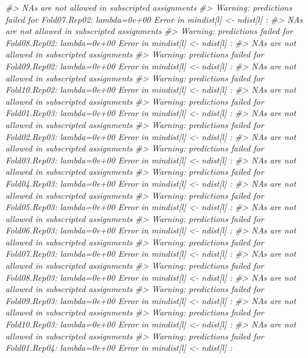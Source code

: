 \documentclass[]{book}
\newenvironment{Shaded}{\begin{snugshade}}{\end{snugshade}}
\newcommand{\CommentTok}[1]{\textcolor[rgb]{0.56,0.35,0.01}{\textit{#1}}}
\begin{document}
\begin{Shaded}
\begin{Highlighting}[]
\CommentTok{#>   NAs are not allowed in subscripted assignments}
\CommentTok{#> Warning: predictions failed for Fold07.Rep02: lambda=0e+00 Error in mindist[l] <- ndist[l] : }
\CommentTok{#>   NAs are not allowed in subscripted assignments}
\CommentTok{#> Warning: predictions failed for Fold08.Rep02: lambda=0e+00 Error in mindist[l] <- ndist[l] : }
\CommentTok{#>   NAs are not allowed in subscripted assignments}
\CommentTok{#> Warning: predictions failed for Fold09.Rep02: lambda=0e+00 Error in mindist[l] <- ndist[l] : }
\CommentTok{#>   NAs are not allowed in subscripted assignments}
\CommentTok{#> Warning: predictions failed for Fold10.Rep02: lambda=0e+00 Error in mindist[l] <- ndist[l] : }
\CommentTok{#>   NAs are not allowed in subscripted assignments}
\CommentTok{#> Warning: predictions failed for Fold01.Rep03: lambda=0e+00 Error in mindist[l] <- ndist[l] : }
\CommentTok{#>   NAs are not allowed in subscripted assignments}
\CommentTok{#> Warning: predictions failed for Fold02.Rep03: lambda=0e+00 Error in mindist[l] <- ndist[l] : }
\CommentTok{#>   NAs are not allowed in subscripted assignments}
\CommentTok{#> Warning: predictions failed for Fold03.Rep03: lambda=0e+00 Error in mindist[l] <- ndist[l] : }
\CommentTok{#>   NAs are not allowed in subscripted assignments}
\CommentTok{#> Warning: predictions failed for Fold04.Rep03: lambda=0e+00 Error in mindist[l] <- ndist[l] : }
\CommentTok{#>   NAs are not allowed in subscripted assignments}
\CommentTok{#> Warning: predictions failed for Fold05.Rep03: lambda=0e+00 Error in mindist[l] <- ndist[l] : }
\CommentTok{#>   NAs are not allowed in subscripted assignments}
\CommentTok{#> Warning: predictions failed for Fold06.Rep03: lambda=0e+00 Error in mindist[l] <- ndist[l] : }
\CommentTok{#>   NAs are not allowed in subscripted assignments}
\CommentTok{#> Warning: predictions failed for Fold07.Rep03: lambda=0e+00 Error in mindist[l] <- ndist[l] : }
\CommentTok{#>   NAs are not allowed in subscripted assignments}
\CommentTok{#> Warning: predictions failed for Fold08.Rep03: lambda=0e+00 Error in mindist[l] <- ndist[l] : }
\CommentTok{#>   NAs are not allowed in subscripted assignments}
\CommentTok{#> Warning: predictions failed for Fold09.Rep03: lambda=0e+00 Error in mindist[l] <- ndist[l] : }
\CommentTok{#>   NAs are not allowed in subscripted assignments}
\CommentTok{#> Warning: predictions failed for Fold10.Rep03: lambda=0e+00 Error in mindist[l] <- ndist[l] : }
\CommentTok{#>   NAs are not allowed in subscripted assignments}
\CommentTok{#> Warning: predictions failed for Fold01.Rep04: lambda=0e+00 Error in mindist[l] <- ndist[l] : }

\end{Highlighting}
\end{Shaded}
\end{document}
